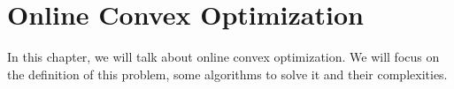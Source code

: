 \documentclass[../main.tex]{subfiles}
\begin{document}
\chapter{Online Convex Optimization}
In this chapter, we will talk about online convex optimization. We will focus on the definition of this problem, some algorithms to solve it and their complexities.
\end{document}
